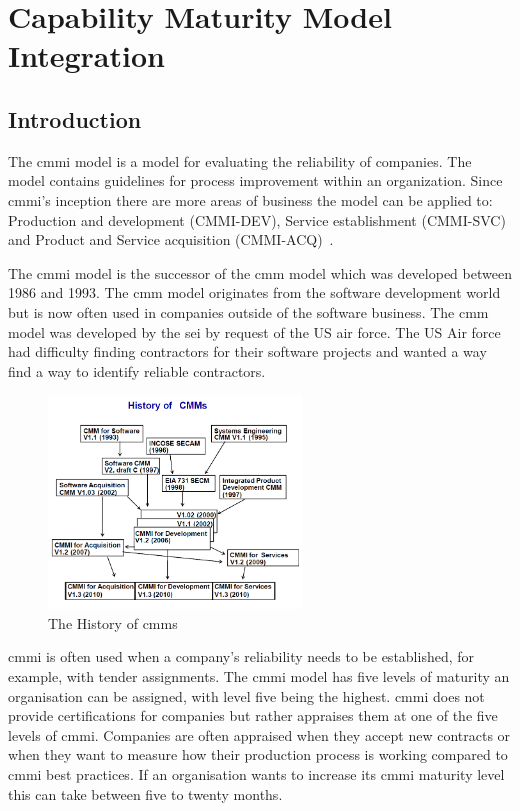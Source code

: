 \chapter{Capability Maturity Model Integration}

\section{Introduction}

The \ac{cmmi} model is a model for evaluating the reliability of companies. The model contains guidelines for process improvement within an organization. Since \ac{cmmi}'s inception there are more areas of business the model can be applied to: Production and development (CMMI-DEV), Service establishment (CMMI-SVC) and Product and Service acquisition (CMMI-ACQ)~\citep{ProductCMMIfor2010}.

The \ac{cmmi} model is the successor of the \ac{cmm} model which was developed between 1986 and 1993. The \ac{cmm} model originates from the software development world but is now often used in companies outside of the software business. The \ac{cmm} model was developed by the \ac{sei} by request of the US air force. The US Air force had difficulty finding contractors for their software projects and wanted a way find a way to identify reliable contractors.

\begin{figure}[!ht]
    \centering
        \includegraphics[width=0.6\textwidth]{graphics/cmmi_history}
    \caption{The History of \acp{cmm}}
    \label{fig:cmmi_history}
\end{figure}

\ac{cmmi} is often used when a company's reliability needs to be established, for example, with tender assignments. The \ac{cmmi} model has five levels of maturity an organisation can be assigned, with level five being the highest. \ac{cmmi} does not provide certifications for companies but rather appraises them at one of the five levels of \ac{cmmi}. Companies are often appraised when they accept new contracts or when they want to measure how their production process is working compared to \ac{cmmi} best practices. If an organisation wants to increase its \ac{cmmi} maturity level this can take between five to twenty months.%

